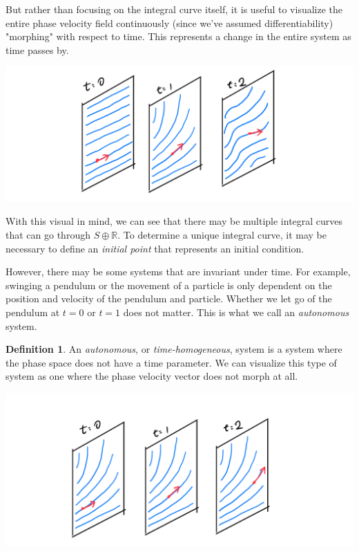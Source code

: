 \documentclass{article}
\theoremstyle{remark}
\theoremstyle{definition}
\newtheorem{definition}{Definition}[section]
\begin{document}
But rather than focusing on the integral curve itself, it is useful to visualize the entire phase velocity field continuously (since we've assumed differentiability) "morphing" with respect to time. This represents a change in the entire system as time passes by. 
\begin{center}
\includegraphics[scale=0.25]{img/Morphing_Field.PNG}
\end{center}
With this visual in mind, we can see that there may be multiple integral curves that can go through $S \oplus \mathbb{R}$. To determine a unique integral curve, it may be necessary to define an \textit{initial point} that represents an initial condition. 

However, there may be some systems that are invariant under time. For example, swinging a pendulum or the movement of a particle is only dependent on the position and velocity of the pendulum and particle. Whether we let go of the pendulum at $t=0$ or $t=1$ does not matter. This is what we call an \textit{autonomous} system. 

\begin{definition}
An \textit{autonomous}, or \textit{time-homogeneous}, system is a system where the phase space does not have a time parameter. We can visualize this type of system as one where the phase velocity vector does not morph at all. 
\begin{center}
    \includegraphics[scale=0.25]{img/Autonomous_Field.PNG}
\end{center}
\end{definition}
\end{document}
